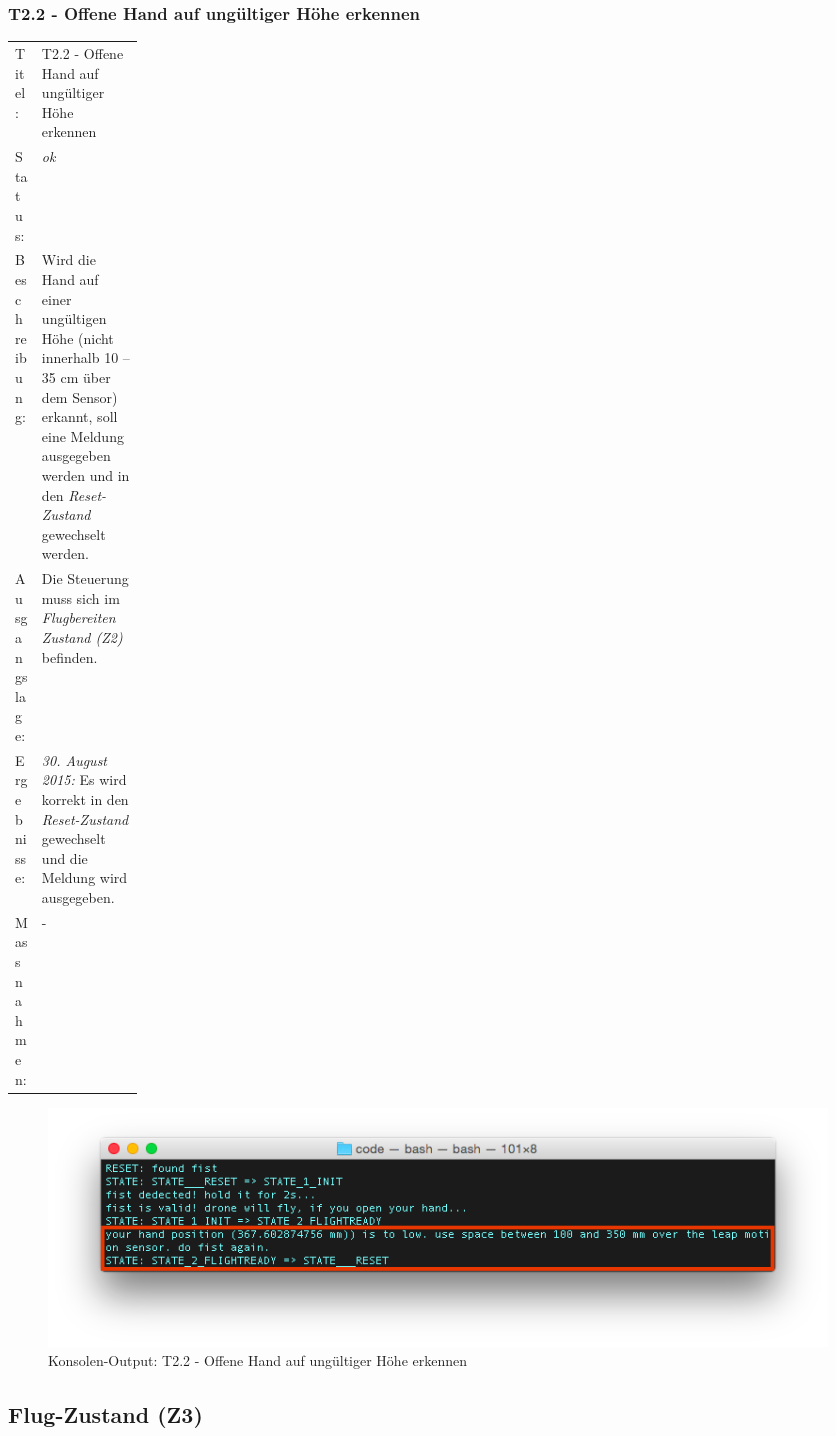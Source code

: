 \subsubsection{T2.2 - Offene Hand auf ungültiger Höhe erkennen}
\begin{table}[H]
	\centering
	\small\renewcommand{\arraystretch}{1.4}
	\begin{tabularx}{0.9\textwidth}{ L{0.15\linewidth} | X  }%
		\hline
		Titel: & T2.2 - Offene Hand auf ungültiger Höhe erkennen\\
		Status: & \textit{ok}\\
		Beschreibung: &  
		Wird die Hand auf einer ungültigen Höhe (nicht innerhalb 10 -- 35 cm über dem Sensor) erkannt, soll eine Meldung ausgegeben werden und in den \textit{Reset-Zustand} gewechselt werden.
		\\
		Ausgangslage: & Die Steuerung muss sich im \textit{Flugbereiten Zustand (Z2)} befinden.\\
		Ergebnisse: & \textit{30. August 2015:}
		Es wird korrekt in den \textit{Reset-Zustand} gewechselt und die Meldung wird ausgegeben.
		\\
		Massnahmen: & -\\
		\hline
	\end{tabularx}
\end{table}
\begin{figure}[H]
	\centering
	\includegraphics[width=1.0\textwidth]{images/testing/t2_2_invalid_height_edit.png}
	\caption{Konsolen-Output: T2.2 - Offene Hand auf ungültiger Höhe erkennen}
	\vspace{-1\baselineskip}
\end{figure}




\newpage
\subsection{Flug-Zustand (Z3)}

